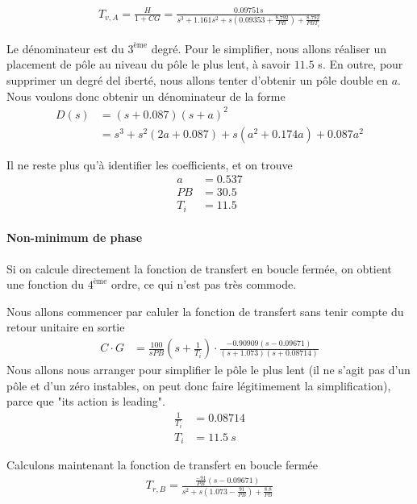 \documentclass[frenchb, paper=a4, fontsize=11pt]{scrartcl}
\numberwithin{equation}{section}					%
\numberwithin{figure}{section}					%
\numberwithin{table}{section}						%
\begin{document}
\begin{align*}
T_{v,A}= \frac{H}{1+CG}= \frac{0.09751s}{s^3+1.161 s^2 + s(0.09353 + \frac{8.792}{PB}) + \frac{8.792}{PB T_i}}
\end{align*}

Le dénominateur est du $3^{\text{ème}}$ degré. Pour le simplifier, nous allons réaliser un placement de pôle au niveau du pôle le plus lent, à savoir $11.5$ s. En outre, pour supprimer un degré del iberté, nous allons tenter d'obtenir un pôle double en $a$.
Nous voulons donc obtenir un dénominateur de la forme
\begin{align*}
D(s) &= (s+0.087)(s+a)^2\\
&= s^3 + s^2 (2a+0.087) + s(a^2 + 0.174a) + 0.087a^2
\end{align*}

Il ne reste plus qu'à identifier les coefficients, et on trouve
\begin{align*}
a&=0.537\\
PB&=30.5\\
T_i &= 11.5
\end{align*}

\paragraph{Non-minimum de phase}

Si on calcule directement la fonction de transfert en boucle fermée, on obtient une fonction du $4^{\text{ème}}$ ordre, ce qui n'est pas très commode.

Nous allons commencer par caluler la fonction de transfert sans tenir compte du retour unitaire en sortie
\begin{align*}
C\cdot G &= \frac{100}{s PB}(s+\frac{1}{T_i}) \cdot \frac{-0.90909(s-0.09671)}{(s+1.073)(s+0.08714)}
\end{align*} 
Nous allons nous arranger pour simplifier le pôle le plus lent (il ne s'agit pas d'un pôle et d'un zéro instables, on peut donc faire légitimement la simplification), parce que "its action is leading".
\begin{align*}
\frac{1}{T_i} &= 0.08714\\
T_i &= 11.5\ s
\end{align*}


Calculons maintenant la fonction de transfert en boucle fermée
\begin{align*}
T_{r,B} = \frac{\frac{-91}{PB}(s-0.09671)}{s^2 + s (1.073-\frac{91}{PB}) + \frac{8.8}{PB}}
\end{align*}
\end{document}
